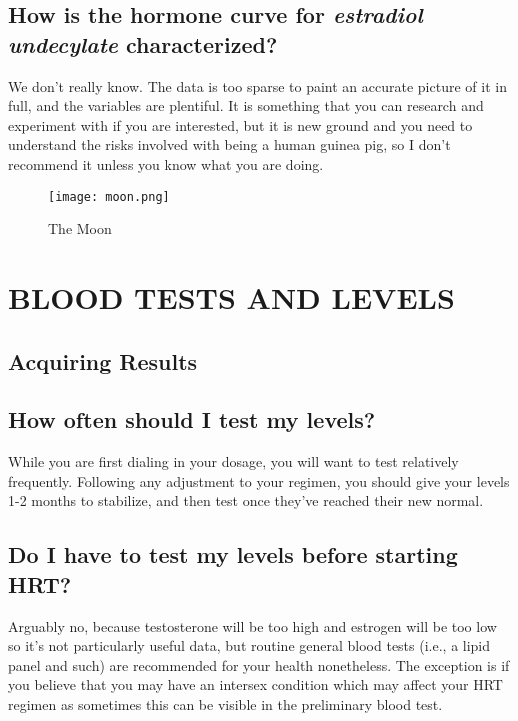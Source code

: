 \documentclass{article}
\begin{document}
\subsection{How is the hormone curve for \textit{estradiol undecylate} characterized?}

We don’t really know. The data is too sparse to paint an accurate picture of it in full, and the variables are plentiful. It is something that you can research and experiment with if you are interested, but it is new ground and you need to understand the risks involved with being a human guinea pig, so I don’t recommend it unless you know what you are doing.

 \begin{figure}[H]
     \centering
     \texttt{[image: moon.png]}
     \caption{The Moon}
     \label{fig:moon}
 \end{figure}

 

\section{BLOOD TESTS AND LEVELS}

\subsection*{Acquiring Results}

\subsection{How often should I test my levels?}

While you are first dialing in your dosage, you will want to test relatively frequently. Following any adjustment to your regimen, you should give your levels 1-2 months to stabilize, and then test once they've reached their new normal.

\subsection{Do I have to test my levels before starting HRT?}

Arguably no, because testosterone will be too high and estrogen will be too low so it’s not particularly useful data, but routine general blood tests (i.e., a lipid panel and such) are recommended for your health nonetheless. The exception is if you believe that you may have an intersex condition which may affect your HRT regimen as sometimes this can be visible in the preliminary blood test.
\end{document}
